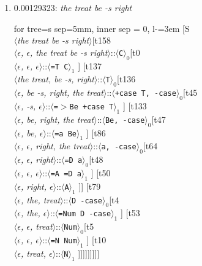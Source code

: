 \documentclass[11pt]{article}
\begin{document}
\begin{enumerate}
	\item  0.00129323: \textit{the treat be -s right} \\[0.5em]
	\begin{forest}
	for tree={s sep=5mm, inner sep = 0, l-=3em}
	[S\\$\langle$\textit{the treat be -s right}$\rangle$[t158\\$\langle$\textit{$\epsilon${,} $\epsilon${,} the treat be -s right}$\rangle$::$\langle$\texttt{C}$\rangle_0$[t0\\$\langle$\textit{$\epsilon${,} $\epsilon${,} $\epsilon$}$\rangle$::$\langle$\texttt{{=}T C}$\rangle_1$ ] [t137\\$\langle$\textit{the treat{,} be -s{,} right}$\rangle$::$\langle$\texttt{T}$\rangle_0$[t136\\$\langle$\textit{$\epsilon${,} be -s{,} right{,} the treat}$\rangle$::$\langle$\texttt{+case T{,} -case}$\rangle_0$[t45\\$\langle$\textit{$\epsilon${,} -s{,} $\epsilon$}$\rangle$::$\langle$\texttt{{=}$>$Be +case T}$\rangle_1$ ] [t133\\$\langle$\textit{$\epsilon${,} be{,} right{,} the treat}$\rangle$::$\langle$\texttt{Be{,} -case}$\rangle_0$[t47\\$\langle$\textit{$\epsilon${,} be{,} $\epsilon$}$\rangle$::$\langle$\texttt{{=}a Be}$\rangle_1$ ] [t86\\$\langle$\textit{$\epsilon${,} $\epsilon${,} right{,} the treat}$\rangle$::$\langle$\texttt{a{,} -case}$\rangle_0$[t64\\$\langle$\textit{$\epsilon${,} $\epsilon${,} right}$\rangle$::$\langle$\texttt{{=}D a}$\rangle_0$[t48\\$\langle$\textit{$\epsilon${,} $\epsilon${,} $\epsilon$}$\rangle$::$\langle$\texttt{{=}A {=}D a}$\rangle_1$ ] [t50\\$\langle$\textit{$\epsilon${,} right{,} $\epsilon$}$\rangle$::$\langle$\texttt{A}$\rangle_1$ ]] [t79\\$\langle$\textit{$\epsilon${,} the{,} treat}$\rangle$::$\langle$\texttt{D -case}$\rangle_0$[t4\\$\langle$\textit{$\epsilon${,} the{,} $\epsilon$}$\rangle$::$\langle$\texttt{{=}Num D -case}$\rangle_1$ ] [t53\\$\langle$\textit{$\epsilon${,} $\epsilon${,} treat}$\rangle$::$\langle$\texttt{Num}$\rangle_0$[t5\\$\langle$\textit{$\epsilon${,} $\epsilon${,} $\epsilon$}$\rangle$::$\langle$\texttt{{=}N Num}$\rangle_1$ ] [t10\\$\langle$\textit{$\epsilon${,} treat{,} $\epsilon$}$\rangle$::$\langle$\texttt{N}$\rangle_1$ ]]]]]]]]]
	\end{forest}
	\newpage


\end{enumerate}
\end{document}
